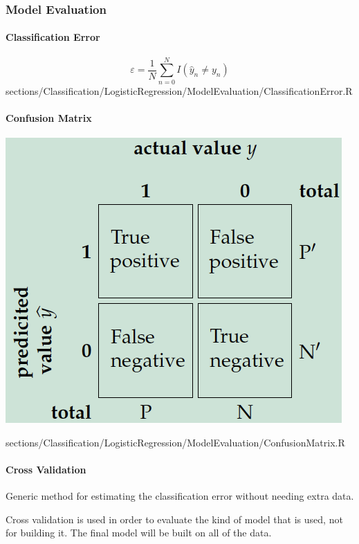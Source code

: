 \subsubsection{Model Evaluation}
	\paragraph{Classification Error}
		\RTheory
		{
			$$\varepsilon = \frac{1}{N}\sum\limits_{n = 0}^N I(\hat{y}_n \neq y_n)$$
		}
		{
			sections/Classification/LogisticRegression/ModelEvaluation/ClassificationError.R
		}
		
	\paragraph{Confusion Matrix}
		\RTheory
		{
			\vspace{0pt}
			
			\includegraphics{images/ConfusionMatrix.png}
		}
		{
			sections/Classification/LogisticRegression/ModelEvaluation/ConfusionMatrix.R
		}
		
	\paragraph{Cross Validation}
		Generic method for estimating the classification error without needing extra data.
		
		Cross validation is used in order to evaluate the kind of model that is used, not for building it.	 The final model will be built on all of the data.
		 
